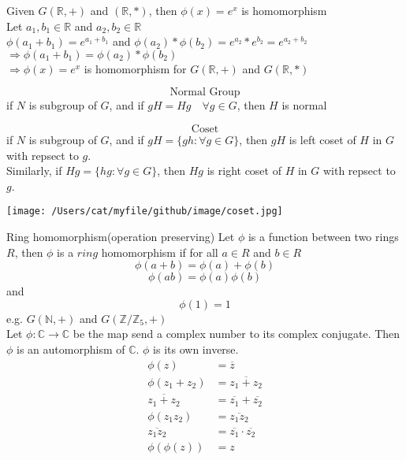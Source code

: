 \documentclass{book}
\begin{document}
Given $G(\mathbb{R}, +)$ and $(\mathbb{R}, *)$, then $\phi(x) = e^x$ is homomorphism\\ 
Let $a_1, b_1 \in \mathbb{R}$ and $a_2, b_2 \in \mathbb{R}$\\ 
$\phi(a_1+b_1) = e^{a_1 + b_1}$ and $\phi(a_2)*\phi(b_2) = e^{a_2}*e^{b_2} = e^{a_2+b_2}$\\
$\Rightarrow \phi(a_1 + b_1) = \phi(a_2)*\phi(b_2)$\\
$\Rightarrow \phi(x) = e^{x}$ is homomorphism for $G(\mathbb{R}, +)$ and $G(\mathbb{R}, *)$

\[\text{Normal Group} \]
if $N$ is subgroup of $G$, and if $gH = Hg \quad \forall g \in G$, then $H$ is normal

\[ \text{Coset} \]
if $N$ is subgroup of $G$, and if $gH = \{gh: \forall g \in G \}$, then $gH$ is left coset of $H$ in $G$ with repsect to $g$.\\
Similarly, if $Hg = \{hg: \forall g \in G \}$, then $Hg$ is right coset of $H$ in $G$ with repsect to $g$.\\
\begin{center}
\texttt{[image: /Users/cat/myfile/github/image/coset.jpg]}\\
\end{center}

\newpage
Ring homomorphism(operation preserving)
Let $\phi$ is a function between two rings $R$, then $\phi$ is a $\mathit{ring}$ homomorphism if
for all $a \in R$ and $b \in R$ 
\[\phi(a+b) = \phi(a) + \phi(b)\] 
\[\phi(ab) = \phi(a)\phi(b)\]
and \[\phi(1) = 1\]
e.g. $G(\mathbb{N}, +)$ and $G(\mathbb{Z}/\mathbb{Z}_5, +)$\\

Let $\phi: \mathbb{C} \rightarrow \mathbb{C}$ be the map send a complex number to its complex conjugate. Then $\phi$ is an automorphism of $\mathbb{C}$. 
$\phi$ is its own inverse.\\

\begin{equation}
\begin{aligned}
\phi(z) &= \overline{z}\\
\phi(z_1 + z_2) &= \overline{z_1 + z_2}\\
\overline{z_1 + z_2} &= \overline{z_1} + \overline{z_2}\\
\phi(z_1 z_2) &= \overline{z_1 z_2}\\
\overline{z_1 z_2} &= \overline{z_1} \cdot \overline{z_2} \nonumber\\
\phi(\phi(z)) &= z\\
\end{aligned}
\end{equation}
\end{document}
